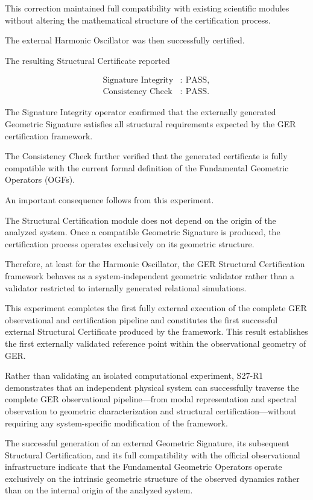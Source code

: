 This correction maintained full compatibility with existing scientific modules without altering the mathematical structure of the certification process.

The external Harmonic Oscillator was then successfully certified.

The resulting Structural Certificate reported

\[
\begin{aligned}
\text{Signature Integrity} &:\ \mathrm{PASS},\\
\text{Consistency Check} &:\ \mathrm{PASS}.
\end{aligned}
\]

The Signature Integrity operator confirmed that the externally generated Geometric Signature satisfies all structural requirements expected by the GER certification framework.

The Consistency Check further verified that the generated certificate is fully compatible with the current formal definition of the Fundamental Geometric Operators (OGFs).

An important consequence follows from this experiment.

The Structural Certification module does not depend on the origin of the analyzed system. Once a compatible Geometric Signature is produced, the certification process operates exclusively on its geometric structure.

Therefore, at least for the Harmonic Oscillator, the GER Structural Certification framework behaves as a system-independent geometric validator rather than a validator restricted to internally generated relational simulations.

This experiment completes the first fully external execution of the complete GER observational and certification pipeline and constitutes the first successful external Structural Certificate produced by the framework.
This result establishes the first externally validated reference point within the observational geometry of GER.

Rather than validating an isolated computational experiment, S27-R1 demonstrates that an independent physical system can successfully traverse the complete GER observational pipeline—from modal representation and spectral observation to geometric characterization and structural certification—without requiring any system-specific modification of the framework.

The successful generation of an external Geometric Signature, its subsequent Structural Certification, and its full compatibility with the official observational infrastructure indicate that the Fundamental Geometric Operators operate exclusively on the intrinsic geometric structure of the observed dynamics rather than on the internal origin of the analyzed system.

